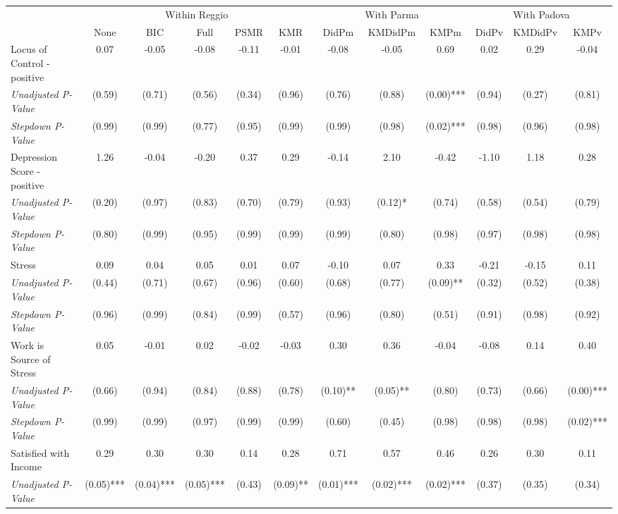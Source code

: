\begin{tabular}{l c c c c c c c c c c c}
\toprule
& \multicolumn{5}{c}{Within Reggio} & \multicolumn{3}{c}{With Parma} & \multicolumn{3}{c}{With Padova} \\\cmidrule(lr){2-6} \cmidrule(lr){7-9} \cmidrule(lr){10-12}
 & None & BIC & Full & PSMR & KMR & DidPm & KMDidPm & KMPm & DidPv & KMDidPv & KMPv \\
\midrule
Locus of Control - positive & 0.07 & -0.05 & -0.08 & -0.11 & -0.01 & -0.08 & -0.05 & 0.69 & 0.02 & 0.29 & -0.04 \\
\quad \textit{Unadjusted P-Value} & (0.59) & (0.71) & (0.56) & (0.34) & (0.96) & (0.76) & (0.88) & (0.00)*** & (0.94) & (0.27) & (0.81) \\
\quad \textit{Stepdown P-Value} & (0.99) & (0.99) & (0.77) & (0.95) & (0.99) & (0.99) & (0.98) & (0.02)*** & (0.98) & (0.96) & (0.98) \\
Depression Score - positive & 1.26 & -0.04 & -0.20 & 0.37 & 0.29 & -0.14 & 2.10 & -0.42 & -1.10 & 1.18 & 0.28 \\
\quad \textit{Unadjusted P-Value} & (0.20) & (0.97) & (0.83) & (0.70) & (0.79) & (0.93) & (0.12)* & (0.74) & (0.58) & (0.54) & (0.79) \\
\quad \textit{Stepdown P-Value} & (0.80) & (0.99) & (0.95) & (0.99) & (0.99) & (0.99) & (0.80) & (0.98) & (0.97) & (0.98) & (0.98) \\
Stress & 0.09 & 0.04 & 0.05 & 0.01 & 0.07 & -0.10 & 0.07 & 0.33 & -0.21 & -0.15 & 0.11 \\
\quad \textit{Unadjusted P-Value} & (0.44) & (0.71) & (0.67) & (0.96) & (0.60) & (0.68) & (0.77) & (0.09)** & (0.32) & (0.52) & (0.38) \\
\quad \textit{Stepdown P-Value} & (0.96) & (0.99) & (0.84) & (0.99) & (0.57) & (0.96) & (0.80) & (0.51) & (0.91) & (0.98) & (0.92) \\
Work is Source of Stress & 0.05 & -0.01 & 0.02 & -0.02 & -0.03 & 0.30 & 0.36 & -0.04 & -0.08 & 0.14 & 0.40 \\
\quad \textit{Unadjusted P-Value} & (0.66) & (0.94) & (0.84) & (0.88) & (0.78) & (0.10)** & (0.05)** & (0.80) & (0.73) & (0.66) & (0.00)*** \\
\quad \textit{Stepdown P-Value} & (0.99) & (0.99) & (0.97) & (0.99) & (0.99) & (0.60) & (0.45) & (0.98) & (0.98) & (0.98) & (0.02)*** \\
Satisfied with Income & 0.29 & 0.30 & 0.30 & 0.14 & 0.28 & 0.71 & 0.57 & 0.46 & 0.26 & 0.30 & 0.11 \\
\quad \textit{Unadjusted P-Value} & (0.05)*** & (0.04)*** & (0.05)*** & (0.43) & (0.09)** & (0.01)*** & (0.02)*** & (0.02)*** & (0.37) & (0.35) & (0.34) \\

\end{tabular}
